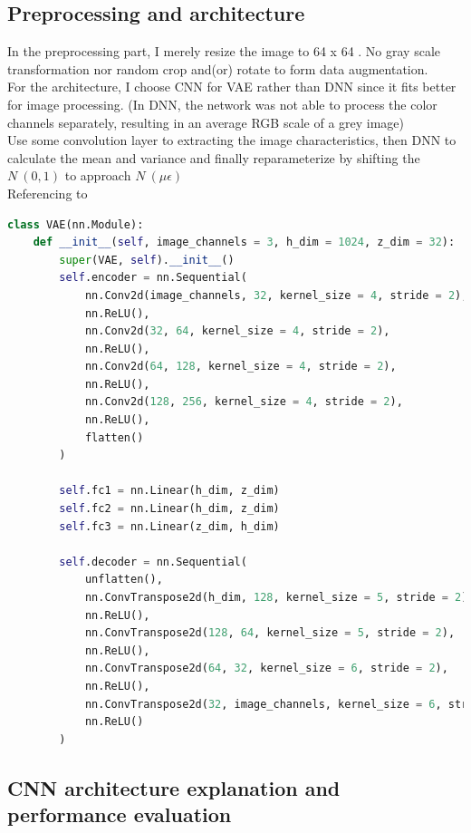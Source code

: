 \documentclass[11pt, a4paper]{article} %
\begin{document}
\subsection{Preprocessing and architecture} %
In the preprocessing part, I merely resize the image to 64 x 64 . No gray scale transformation nor random crop and(or) rotate to form data augmentation.
\\ For the architecture, I choose CNN for VAE rather than DNN since it fits better for image processing.
(In DNN, the network was not able to process the color channels separately, resulting in an average RGB scale of a grey image)
\\ Use some convolution layer to extracting the image characteristics, then DNN to calculate the mean and variance and finally reparameterize by shifting the  $N~(0, 1)$ to approach $N~(\mu \epsilon)$
\\ Referencing to \url{}
\begin{lstlisting}[language = python]
class VAE(nn.Module):
    def __init__(self, image_channels = 3, h_dim = 1024, z_dim = 32):
        super(VAE, self).__init__()
        self.encoder = nn.Sequential(
            nn.Conv2d(image_channels, 32, kernel_size = 4, stride = 2),
            nn.ReLU(),
            nn.Conv2d(32, 64, kernel_size = 4, stride = 2),
            nn.ReLU(),
            nn.Conv2d(64, 128, kernel_size = 4, stride = 2),
            nn.ReLU(),
            nn.Conv2d(128, 256, kernel_size = 4, stride = 2),
            nn.ReLU(),
            flatten()
        )

        self.fc1 = nn.Linear(h_dim, z_dim)
        self.fc2 = nn.Linear(h_dim, z_dim)
        self.fc3 = nn.Linear(z_dim, h_dim)

        self.decoder = nn.Sequential(
            unflatten(),
            nn.ConvTranspose2d(h_dim, 128, kernel_size = 5, stride = 2),
            nn.ReLU(),
            nn.ConvTranspose2d(128, 64, kernel_size = 5, stride = 2),
            nn.ReLU(),
            nn.ConvTranspose2d(64, 32, kernel_size = 6, stride = 2),
            nn.ReLU(),
            nn.ConvTranspose2d(32, image_channels, kernel_size = 6, stride = 2),
            nn.ReLU()
        )
\end{lstlisting}

\subsection{CNN architecture explanation and performance evaluation} %
\end{document}
